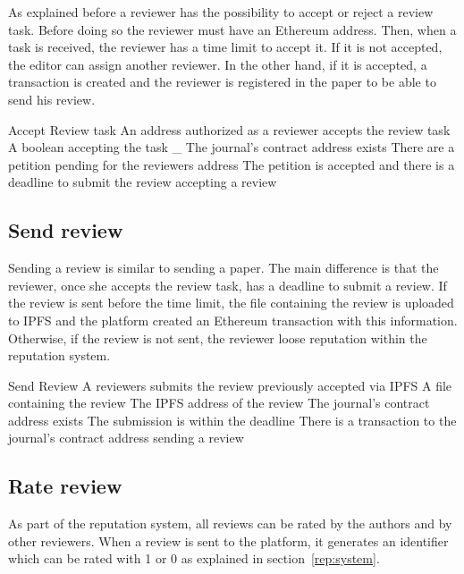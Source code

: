 As explained before a reviewer has the possibility to accept or reject a review
task. Before doing so the reviewer must have an Ethereum address. Then, when a
task is received, the reviewer has a time limit to accept it. If it is not
accepted, the editor can assign another reviewer. In the other hand, if it is
accepted, a transaction is created and the reviewer is registered in the paper
to be able to send his review.

{Accept Review task}%
{An address authorized as a reviewer accepts the review
  task}%
{A boolean accepting the task}%
{_}%
{The journal's contract address exists}%
{There are a petition pending for the reviewers address}%
{The petition is accepted and there is a deadline to submit the
  review}%
{accepting a review}%

\subsection*{Send review}

Sending a review is similar to sending a paper. The main difference is that the
reviewer, once she accepts the review task, has a deadline to submit a review.
If the review is sent before the time limit, the file containing the review is
uploaded to IPFS and the platform created an Ethereum transaction with this
information. Otherwise, if the review is not sent, the reviewer loose reputation
within the reputation system.

{Send Review}%
{A reviewers submits the review previously accepted via
  IPFS}%
{A file containing the review}%
{The IPFS address of the review}%
{The journal's contract address exists}%
{The submission is within the deadline}%
{There is a transaction to the journal's contract address}%
{sending a review}%

\subsection*{Rate review}

As part of the reputation system, all reviews can be rated by the authors and by
other reviewers. When a review is sent to the platform, it generates an
identifier which can be rated with 1 or 0 as explained in
section~\ref{rep:system}.

